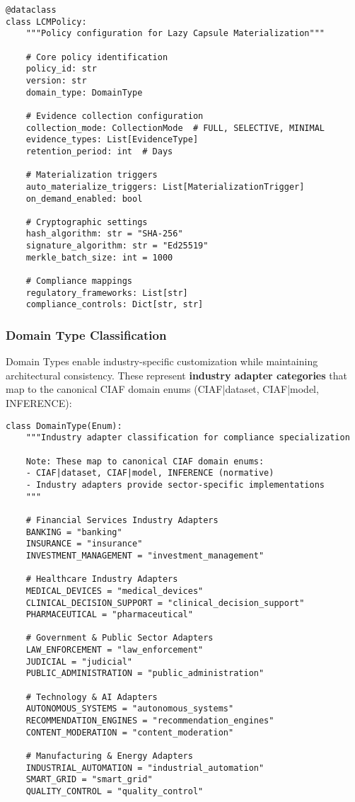 \documentclass[12pt,a4paper]{article}
\begin{document}
\begin{lstlisting}[caption=LCM Policy Data Structure]
@dataclass
class LCMPolicy:
    """Policy configuration for Lazy Capsule Materialization"""
    
    # Core policy identification
    policy_id: str
    version: str
    domain_type: DomainType
    
    # Evidence collection configuration
    collection_mode: CollectionMode  # FULL, SELECTIVE, MINIMAL
    evidence_types: List[EvidenceType]
    retention_period: int  # Days
    
    # Materialization triggers
    auto_materialize_triggers: List[MaterializationTrigger]
    on_demand_enabled: bool
    
    # Cryptographic settings
    hash_algorithm: str = "SHA-256"
    signature_algorithm: str = "Ed25519"
    merkle_batch_size: int = 1000
    
    # Compliance mappings
    regulatory_frameworks: List[str]
    compliance_controls: Dict[str, str]
\end{lstlisting}

\subsubsection{Domain Type Classification}

Domain Types enable industry-specific customization while maintaining architectural consistency. These represent \textbf{industry adapter categories} that map to the canonical CIAF domain enums (CIAF|dataset, CIAF|model, INFERENCE):

\begin{lstlisting}[caption=Industry Adapter Domain Types]
class DomainType(Enum):
    """Industry adapter classification for compliance specialization
    
    Note: These map to canonical CIAF domain enums:
    - CIAF|dataset, CIAF|model, INFERENCE (normative)
    - Industry adapters provide sector-specific implementations
    """
    
    # Financial Services Industry Adapters
    BANKING = "banking"
    INSURANCE = "insurance" 
    INVESTMENT_MANAGEMENT = "investment_management"
    
    # Healthcare Industry Adapters
    MEDICAL_DEVICES = "medical_devices"
    CLINICAL_DECISION_SUPPORT = "clinical_decision_support"
    PHARMACEUTICAL = "pharmaceutical"
    
    # Government & Public Sector Adapters
    LAW_ENFORCEMENT = "law_enforcement"
    JUDICIAL = "judicial"
    PUBLIC_ADMINISTRATION = "public_administration"
    
    # Technology & AI Adapters
    AUTONOMOUS_SYSTEMS = "autonomous_systems"
    RECOMMENDATION_ENGINES = "recommendation_engines"
    CONTENT_MODERATION = "content_moderation"
    
    # Manufacturing & Energy Adapters
    INDUSTRIAL_AUTOMATION = "industrial_automation"
    SMART_GRID = "smart_grid"
    QUALITY_CONTROL = "quality_control"
\end{lstlisting}
\end{document}
